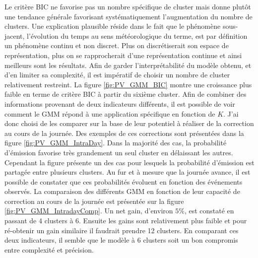 \documentclass[12pt]{report}
\begin{document}
Le critère BIC ne favorise pas un nombre spécifique de cluster mais donne plutôt une tendance générale favorisant systématiquement l'augmentation du nombre de clusters. Une explication plausible réside dans le fait que le phénomène sous-jacent, l'évolution du temps au sens météorologique du terme, est par définition un phénomène continu et non discret. Plus on discrétiserait son espace de représentation, plus on se rapprocherait d'une représentation continue et ainsi meilleurs sont les résultats. Afin de garder l'interprétabilité du modèle obtenu, et d'en limiter sa complexité, il est impératif de choisir un nombre de cluster relativement restreint. La figure \ref{fig:PV_GMM_BIC} montre une croissance plus faible en terme de critère BIC à partir du sixième cluster. Afin de combiner des informations provenant de deux indicateurs différents, il est possible de voir comment le GMM répond à une application spécifique en fonction de $K$. J'ai donc choisi de les comparer sur la base de leur potentiel à réaliser de la correction au cours de la journée. Des exemples de ces corrections sont présentées dans la figure \ref{fig:PV_GMM_IntraDay}. Dans la majorité des cas, la probabilité d'émission favorise très grandement un seul cluster en délaissant les autres. Cependant la figure présente un des cas pour lesquels la probabilité d'émission est partagée entre plusieurs clusters. Au fur et à mesure que la journée avance, il est possible de constater que ces probabilités évoluent en fonction des événements observés. La comparaison des différents GMM en fonction de leur capacité de correction au cours de la journée est présentée sur la figure \ref{fig:PV_GMM_IntradayComp}. Un net gain, d'environ $5\%$, est constaté en passant de 4 clusters à 6. Ensuite les gains sont relativement plus faible et pour ré-obtenir un gain similaire il faudrait prendre 12 clusters. En comparant ces deux indicateurs, il semble que le modèle à 6 clusters soit un bon compromis entre complexité et précision.
\end{document}
